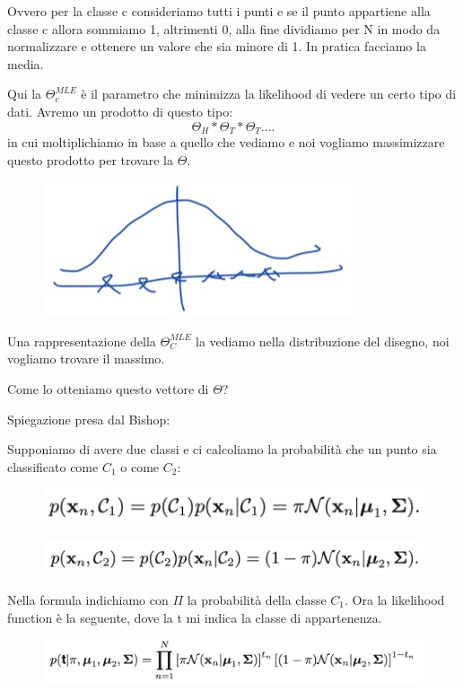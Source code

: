 \documentclass[14pt]{extreport}
\begin{document}
Ovvero per la classe c consideriamo tutti i punti e se il punto appartiene alla classe c allora sommiamo 1, altrimenti 0, alla fine dividiamo per N in
modo da normalizzare e ottenere un valore che sia minore di 1. In pratica facciamo la media.


Qui la $\Theta_c^{MLE}$ è il parametro che minimizza la likelihood di vedere un certo tipo di dati. Avremo un prodotto di questo tipo:
$$\Theta_H*\Theta_T*\Theta_T....$$ in cui moltiplichiamo in base a quello che vediamo e noi vogliamo massimizzare questo prodotto per trovare la
$\Theta$.
\begin{figure}[H]
\centering
\includegraphics[width=0.4\linewidth]{175.jpeg}
\end{figure}

Una rappresentazione della $\Theta_C^{MLE}$ la vediamo nella distribuzione del disegno, noi vogliamo trovare il massimo.


Come lo otteniamo questo vettore di $\Theta$?

Spiegazione presa dal Bishop:

Supponiamo di avere due classi e ci calcoliamo la probabilità che un punto sia classificato come $C_1$ o come $C_2$:

\begin{figure}[H]
\centering
\includegraphics[width=0.7\linewidth]{202.jpeg}
\end{figure}
\begin{figure}[H]
\centering
\includegraphics[width=0.7\linewidth]{203.jpeg}
\end{figure}

Nella formula indichiamo con $\Pi$ la probabilità della classe $C_1$. Ora la likelihood function è la seguente, dove la t mi indica la classe di
appartenenza.

\begin{figure}[H]
\centering
\includegraphics[width=0.7\linewidth]{204.jpeg}
\end{figure}
\end{document}
